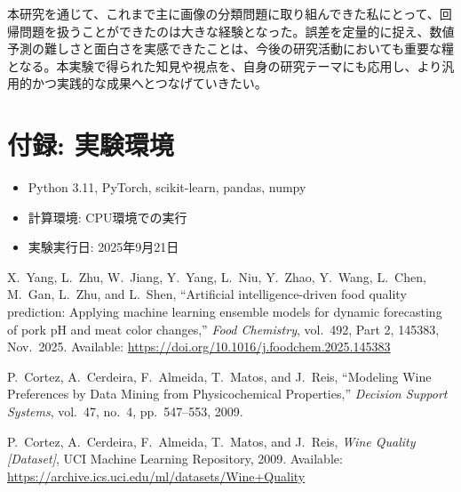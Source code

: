 \documentclass[12pt,a4paper,dvipdfmx]{jsarticle}
\begin{document}
本研究を通じて、これまで主に画像の分類問題に取り組んできた私にとって、回帰問題を扱うことができたのは大きな経験となった。誤差を定量的に捉え、数値予測の難しさと面白さを実感できたことは、今後の研究活動においても重要な糧となる。本実験で得られた知見や視点を、自身の研究テーマにも応用し、より汎用的かつ実践的な成果へとつなげていきたい。

\section*{付録: 実験環境}

\begin{itemize}
    \item Python 3.11, PyTorch, scikit-learn, pandas, numpy
    \item 計算環境: CPU環境での実行
    \item 実験実行日: 2025年9月21日
\end{itemize}


\begin{thebibliography}{9}

X.\ Yang, L.\ Zhu, W.\ Jiang, Y.\ Yang, L.\ Niu, Y.\ Zhao, Y.\ Wang, L.\ Chen, M.\ Gan, L.\ Zhu, and L.\ Shen,  
“Artificial intelligence-driven food quality prediction: Applying machine learning ensemble models for dynamic forecasting of pork pH and meat color changes,”  
\emph{Food Chemistry}, vol.\ 492, Part 2, 145383, Nov.\ 2025.  
Available: \url{https://doi.org/10.1016/j.foodchem.2025.145383}

P.\ Cortez, A.\ Cerdeira, F.\ Almeida, T.\ Matos, and J.\ Reis,
“Modeling Wine Preferences by Data Mining from Physicochemical Properties,”
\emph{Decision Support Systems}, vol.\ 47, no.\ 4, pp.\ 547–553, 2009.

P.\ Cortez, A.\ Cerdeira, F.\ Almeida, T.\ Matos, and J.\ Reis,
\emph{Wine Quality [Dataset]}, UCI Machine Learning Repository, 2009.
Available: \url{https://archive.ics.uci.edu/ml/datasets/Wine+Quality}

\end{thebibliography}
\end{document}
